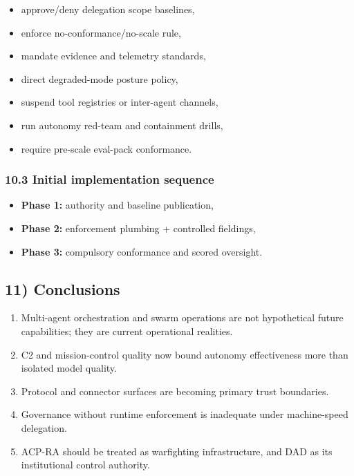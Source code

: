 \documentclass[11pt]{article}
\begin{document}
\begin{itemize}
\tightlist
\item
  approve/deny delegation scope baselines,
\item
  enforce no-conformance/no-scale rule,
\item
  mandate evidence and telemetry standards,
\item
  direct degraded-mode posture policy,
\item
  suspend tool registries or inter-agent channels,
\item
  run autonomy red-team and containment drills,
\item
  require pre-scale eval-pack conformance.
\end{itemize}

\hypertarget{initial-implementation-sequence}{%
\subsubsection{10.3 Initial implementation
sequence}\label{initial-implementation-sequence}}

\begin{itemize}
\tightlist
\item
  \textbf{Phase 1:} authority and baseline publication,
\item
  \textbf{Phase 2:} enforcement plumbing + controlled fieldings,
\item
  \textbf{Phase 3:} compulsory conformance and scored oversight.
\end{itemize}

\hypertarget{conclusions}{%
\subsection{11) Conclusions}\label{conclusions}}

\begin{enumerate}
\def\labelenumi{\arabic{enumi}.}
\tightlist
\item
  Multi-agent orchestration and swarm operations are not hypothetical
  future capabilities; they are current operational realities.
\item
  C2 and mission-control quality now bound autonomy effectiveness more
  than isolated model quality.
\item
  Protocol and connector surfaces are becoming primary trust boundaries.
\item
  Governance without runtime enforcement is inadequate under
  machine-speed delegation.
\item
  ACP-RA should be treated as warfighting infrastructure, and DAD as its
  institutional control authority.
\end{enumerate}
\end{document}
